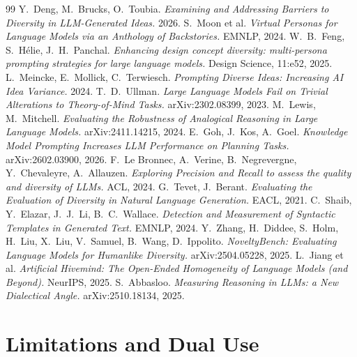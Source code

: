 \documentclass[11pt]{article}
\begin{document}
\begin{thebibliography}{99}
 Y.\ Deng, M.\ Brucks, O.\ Toubia. \emph{Examining and Addressing Barriers to Diversity in LLM-Generated Ideas.} 2026.
 S.\ Moon et al. \emph{Virtual Personas for Language Models via an Anthology of Backstories.} EMNLP, 2024.
 W.\ B.\ Feng, S.\ H\'elie, J.\ H.\ Panchal. \emph{Enhancing design concept diversity: multi-persona prompting strategies for large language models.} Design Science, 11:e52, 2025.
 L.\ Meincke, E.\ Mollick, C.\ Terwiesch. \emph{Prompting Diverse Ideas: Increasing AI Idea Variance.} 2024.
 T.\ D.\ Ullman. \emph{Large Language Models Fail on Trivial Alterations to Theory-of-Mind Tasks.} arXiv:2302.08399, 2023.
 M.\ Lewis, M.\ Mitchell. \emph{Evaluating the Robustness of Analogical Reasoning in Large Language Models.} arXiv:2411.14215, 2024.
 E.\ Goh, J.\ Kos, A.\ Goel. \emph{Knowledge Model Prompting Increases LLM Performance on Planning Tasks.} arXiv:2602.03900, 2026.
 F.\ Le Bronnec, A.\ Verine, B.\ Negrevergne, Y.\ Chevaleyre, A.\ Allauzen. \emph{Exploring Precision and Recall to assess the quality and diversity of LLMs.} ACL, 2024.
 G.\ Tevet, J.\ Berant. \emph{Evaluating the Evaluation of Diversity in Natural Language Generation.} EACL, 2021.
 C.\ Shaib, Y.\ Elazar, J.\ J.\ Li, B.\ C.\ Wallace. \emph{Detection and Measurement of Syntactic Templates in Generated Text.} EMNLP, 2024.
 Y.\ Zhang, H.\ Diddee, S.\ Holm, H.\ Liu, X.\ Liu, V.\ Samuel, B.\ Wang, D.\ Ippolito. \emph{NoveltyBench: Evaluating Language Models for Humanlike Diversity.} arXiv:2504.05228, 2025.
 L.\ Jiang et al. \emph{Artificial Hivemind: The Open-Ended Homogeneity of Language Models (and Beyond).} NeurIPS, 2025.
 S.\ Abbasloo. \emph{Measuring Reasoning in LLMs: a New Dialectical Angle.} arXiv:2510.18134, 2025.
\end{thebibliography}

\appendix
\sloppy
{}

\section{Limitations and Dual Use}
\label{app:limits}
\end{document}

